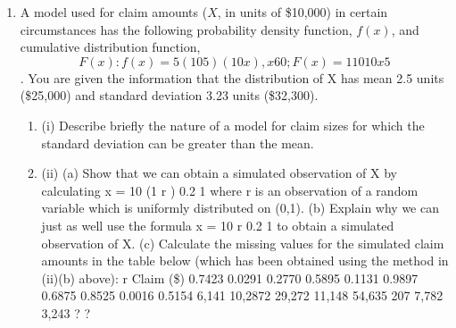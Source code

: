 \documentclass[a4paper,12pt]{article}
\begin{document}
\begin{enumerate}
\item A model used for claim amounts ($X$, in units of \$10,000) in certain circumstances has
the following probability density function, $f(x)$, and cumulative distribution function,
\[ F(x):
f ( x ) =
5(10 5 )
(10 x )
, x
6
0 ; F ( x ) = 1
10
10 x
5\]
.
You are given the information that the distribution of X has mean 2.5 units (\$25,000)
and standard deviation 3.23 units (\$32,300).
\begin{enumerate}
\item (i) Describe briefly the nature of a model for claim sizes for which the standard deviation can be greater than the mean.
\item 
(ii) (a)
Show that we can obtain a simulated observation of X by calculating
x = 10 (1 r )
0.2
1
where r is an observation of a random variable which is uniformly
distributed on (0,1).
(b)
Explain why we can just as well use the formula
x = 10 r
0.2
1
to obtain a simulated observation of X.
(c)
Calculate the missing values for the simulated claim amounts in the table below (which has been obtained using the method in (ii)(b)
above):
r Claim (\$)
0.7423
0.0291
0.2770
0.5895
0.1131
0.9897
0.6875
0.8525
0.0016
0.5154 6,141
10,2872
29,272
11,148
54,635
207
7,782
3,243
?
?
\end{enumerate}


\end{enumerate}
\end{document}
